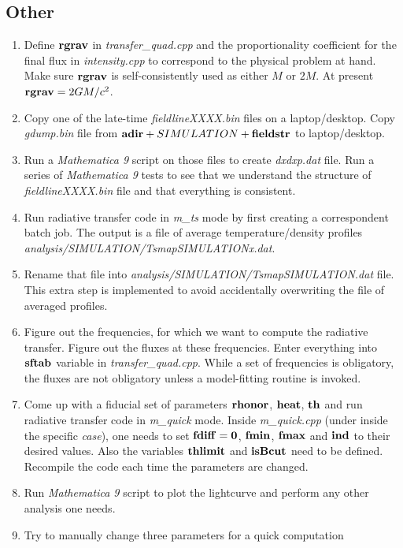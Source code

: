 \documentclass{emulateapj}
\newcommand{\mat}{\textit{Mathematica 9 }}
\begin{document}
\subsection{Other}
\begin{enumerate}
\item{Define ${\bf rgrav}$ in \textit{transfer\_quad.cpp} and the
  proportionality coefficient for the final flux in
  \textit{intensity.cpp} to correspond to the physical problem at
  hand.  Make sure ${\bf rgrav}$ is self-consistently used as either
  $M$ or $2M$. At present ${\bf rgrav}=2GM/c^2$.}
\item{Copy one of the late-time \textit{fieldlineXXXX.bin} files on a
  laptop/desktop. Copy \textit{gdump.bin} file from ${\bf adir}+
  SIMULATION +{\bf fieldstr}$ to laptop/desktop.}
\item{Run a \mat script on those files to create \textit{dxdxp.dat}
  file. Run a series of \mat tests to see that we understand the
  structure of \textit{fieldlineXXXX.bin} file and that everything is
  consistent.}
\item{Run radiative transfer code in \textit{m\_ts} mode by first
  creating a correspondent batch job. The output is a file of average
  temperature/density profiles
  \textit{analysis/SIMULATION/TsmapSIMULATIONx.dat}.}
\item{Rename that file into
  \textit{analysis/SIMULATION/TsmapSIMULATION.dat} file. This extra
  step is implemented to avoid accidentally overwriting the file of
  averaged profiles.}
\item{Figure out the frequencies, for which we want to compute the
  radiative transfer. Figure out the fluxes at these
  frequencies. Enter everything into ${\bf sftab}$ variable in
  \textit{transfer\_quad.cpp}. While a set of frequencies is
  obligatory, the fluxes are not obligatory unless a model-fitting
  routine is invoked.}
\item{Come up with a fiducial set of parameters $\bf rhonor$, $\bf
  heat$, $\bf th$ and run radiative transfer code in \textit{m\_quick}
  mode. Inside \textit{m\_quick.cpp} (under inside the specific
  \textit{case}), one needs to set $\bf fdiff=0$, ${\bf fmin}$, ${\bf
    fmax}$ and ${\bf ind}$ to their desired values. Also the variables
  $\bf thlimit$ and $\bf isBcut$ need to be defined. Recompile the
  code each time the parameters are changed.}
\item{Run \mat script to plot the lightcurve and perform any other
  analysis one needs.}
\item{Try to manually change three parameters for a quick computation
}
\end{enumerate}
\end{document}
